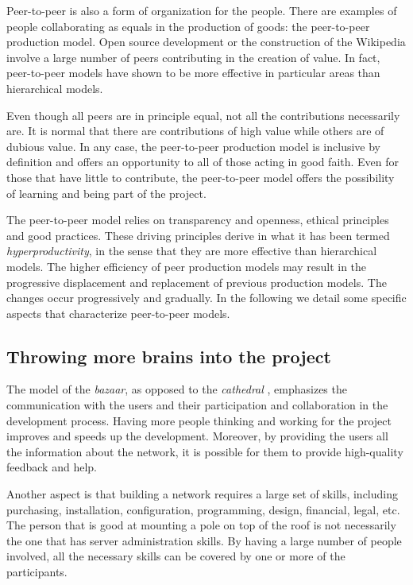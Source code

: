 \documentclass[journal]{IEEEtran}
\begin{document}
Peer-to-peer is also a form of organization for the people.
There are examples of people collaborating as equals in the production of goods: the peer-to-peer production model.
Open source development or the construction of the Wikipedia involve a large number of peers contributing in the creation of value.
In fact, peer-to-peer models have shown to be more effective in particular areas than hierarchical models.

Even though all peers are in principle equal, not all the contributions necessarily are.
It is normal that there are contributions of high value while others are of dubious value.
In any case, the peer-to-peer production model is inclusive by definition and offers an opportunity to all of those acting in good faith.
Even for those that have little to contribute, the peer-to-peer model offers the possibility of learning and being part of the project.

The peer-to-peer model relies on transparency and openness, ethical principles and good practices.
These driving principles derive in what it has been termed \emph{hyperproductivity}, in the sense that they are more effective than hierarchical models.
The higher efficiency of peer production models may result in the progressive displacement and replacement of previous production models.
The changes occur progressively and gradually.
In the following we detail some specific aspects that characterize peer-to-peer models.

\subsection{Throwing more brains into the project}

The model of the \emph{bazaar}, as opposed to the \emph{cathedral} \cite{raymond1999cb}, emphasizes the communication with the users and their participation and collaboration in the development process.
Having more people thinking and working for the project improves and speeds up the development.
Moreover, by providing the users all the information about the network, it is possible for them to provide high-quality feedback and help.

Another aspect is that building a network requires a large set of skills, including purchasing, installation, configuration, programming, design, financial, legal, etc.
The person that is good at mounting a pole on top of the roof is not necessarily the one that has server administration skills.
By having a large number of people involved, all the necessary skills can be covered by one or more of the participants.
\end{document}
